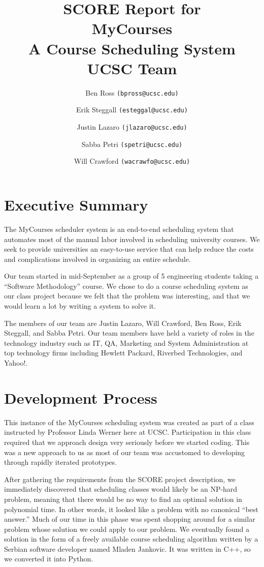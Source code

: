 \documentclass[12pt]{article}
\title{SCORE Report for\\ MyCourses \\ A Course Scheduling System \\ UCSC Team}
\author{Ben Ross \texttt{(bpross@ucsc.edu)} \\
	\and Erik Steggall \texttt{(esteggal@ucsc.edu)}\\
	\and Justin Lazaro \texttt{(jlazaro@ucsc.edu)}\\
	\and Sabba Petri \texttt{(spetri@ucsc.edu)}\\
	\and Will Crawford \texttt{(wacrawfo@ucsc.edu)}}
\date{}
\begin{document}
\maketitle
\pagebreak
\tableofcontents
\pagebreak

\section{Executive Summary}
The MyCourses scheduler system is an end-to-end scheduling system that automates most of the manual labor involved in scheduling university courses. We seek to provide universities an easy-to-use service that can help reduce the costs and complications involved in organizing an entire schedule.


Our team started in mid-September as a group of 5 engineering students taking a ``Software Methodology'' course. We chose to do a course scheduling system as our class project because we felt that the problem was interesting, and that we would learn a lot by writing a system to solve it.

The members of our team are Justin Lazaro, Will Crawford, Ben Ross, Erik Steggall, and Sabba Petri. Our team members have held a variety of roles in the technology industry such as IT, QA, Marketing and System Administration at top technology firms including Hewlett Packard, Riverbed Technologies, and Yahoo!. 


\section{Development Process} %
\indent This instance of the MyCourses scheduling system was created as part of a class instructed by Professor Linda Werner here at UCSC. Participation in this class required that we approach design very seriously before we started coding. This was a new approach to us as most of our team was accustomed to developing through rapidly iterated prototypes.

After gathering the requirements from the SCORE project description, we immediately discovered that scheduling classes would likely be an NP-hard problem, meaning that there would be no way to find an optimal solution in polynomial time. In other words, it looked like a problem with no canonical ``best answer.'' Much of our time in this phase was spent shopping around for a similar problem whose solution we could apply to our problem. We eventually found a solution in the form of a freely available course scheduling algorithm written by a Serbian software developer named Mladen Jankovic. It was written in C++, so we converted it into Python.
\end{document}
